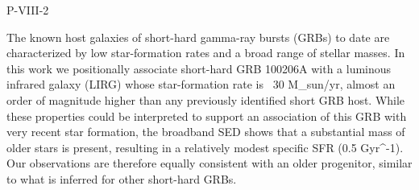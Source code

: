 P-VIII-2


\bigskip



\bigskip

\noindent The known host galaxies of short-hard gamma-ray bursts (GRBs) to date are characterized by low star-formation rates and a broad range of stellar masses.  In this work we positionally associate short-hard GRB 100206A with a luminous infrared galaxy (LIRG) whose star-formation rate is ~30 M_sun/yr, almost an order of magnitude higher than any previously identified short GRB host.  While these properties could be interpreted to support an association of this GRB with very recent star formation, the broadband SED shows that a substantial mass of older stars is present, resulting in a relatively modest specific SFR (0.5 Gyr^-1). Our observations are therefore equally consistent with an older progenitor, similar to what is  inferred for other short-hard GRBs.
